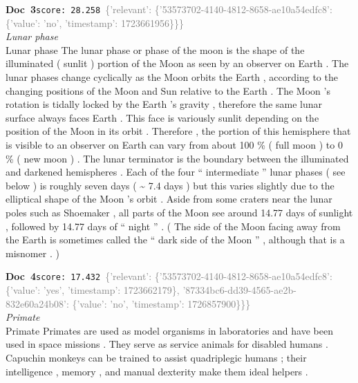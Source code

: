 \documentclass[a4paper,11pt]{article}
\begin{document}
\begin{docenv}
{\footnotesize\textcolor{doccolor}{\textbf{Doc~3}}}\hfill{\tiny\texttt{score:~28.258}}\ {\tiny\textcolor{gray}{\{'relevant': \{'53573702-4140-4812-8658-ae10a54edfc8': \{'value': 'no', 'timestamp': 1723661956\}\}\}}}\\[3pt]
{\small\textit{Lunar phase}}\\[2pt]
\vspace{2pt}
{\footnotesize Lunar phase
The lunar phase or phase of the moon is the shape of the illuminated ( sunlit ) portion of the Moon as seen by an observer on Earth . The lunar phases change cyclically as the Moon orbits the Earth , according to the changing positions of the Moon and Sun relative to the Earth . The Moon 's rotation is tidally locked by the Earth 's gravity , therefore the same lunar surface always faces Earth . This face is variously sunlit depending on the position of the Moon in its orbit . Therefore , the portion of this hemisphere that is visible to an observer on Earth can vary from about 100 \% ( full moon ) to 0 \% ( new moon ) . The lunar terminator is the boundary between the illuminated and darkened hemispheres . Each of the four `` intermediate '' lunar phases ( see below ) is roughly seven days ( \textasciitilde{} 7.4 days ) but this varies slightly due to the elliptical shape of the Moon 's orbit . Aside from some craters near the lunar poles such as Shoemaker , all parts of the Moon see around 14.77 days of sunlight , followed by 14.77 days of `` night '' . ( The side of the Moon facing away from the Earth is sometimes called the `` dark side of the Moon '' , although that is a misnomer . )}
\end{docenv}
\begin{docenv}
{\footnotesize\textcolor{doccolor}{\textbf{Doc~4}}}\hfill{\tiny\texttt{score:~17.432}}\ {\tiny\textcolor{gray}{\{'relevant': \{'53573702-4140-4812-8658-ae10a54edfc8': \{'value': 'yes', 'timestamp': 1723662179\}, '87334bc6-dd39-4565-ae2b-832e60a24b08': \{'value': 'no', 'timestamp': 1726857900\}\}\}}}\\[3pt]
{\small\textit{Primate}}\\[2pt]
\vspace{2pt}
{\footnotesize Primate
Primates are used as model organisms in laboratories and have been used in space missions . They serve as service animals for disabled humans . Capuchin monkeys can be trained to assist quadriplegic humans ; their intelligence , memory , and manual dexterity make them ideal helpers .}
\end{docenv}
\end{document}
